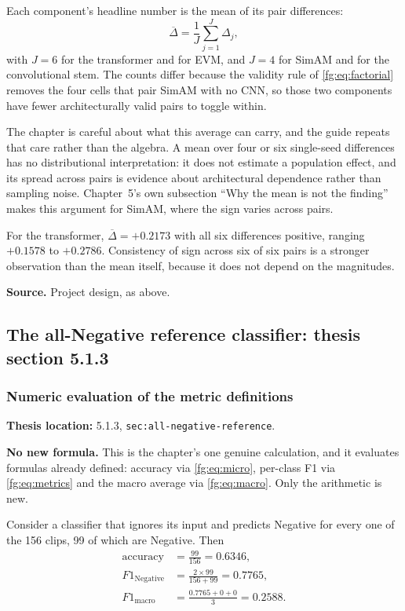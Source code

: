 \documentclass[11pt,a4paper]{article}
\numberwithin{equation}{section}
\begin{document}
Each component's headline number is the mean of its pair differences:
\begin{equation}
    \overline{\Delta} = \frac1J \sum_{j=1}^{J} \Delta_j,
    \label{fg5:eq:mean-effect}
\end{equation}
with $J = 6$ for the transformer and for EVM, and $J = 4$ for SimAM and for
the convolutional stem. The counts differ because the validity rule of
\eqref{fg:eq:factorial} removes the four cells that pair SimAM with no CNN, so those
two components have fewer architecturally valid pairs to toggle within.

The chapter is careful about what this average can carry, and the guide
repeats that care rather than the algebra. A mean over four or six
single-seed differences has no distributional interpretation: it does not
estimate a population effect, and its spread across pairs is evidence about
architectural dependence rather than sampling noise. Chapter~5's own
subsection ``Why the mean is not the finding'' makes this argument for SimAM,
where the sign varies across pairs.

For the transformer, $\overline{\Delta} = +0.2173$ with all six differences
positive, ranging $+0.1578$ to $+0.2786$. Consistency of sign across six of
six pairs is a stronger observation than the mean itself, because it does not
depend on the magnitudes.

\textbf{Source.} Project design, as above.

\subsection{The all-Negative reference classifier: thesis section 5.1.3}

\subsubsection{Numeric evaluation of the metric definitions}
\label{fg5:all-negative}
\textbf{Thesis location:} 5.1.3, \texttt{sec:all-negative-reference}.

\textbf{No new formula.} This is the chapter's one genuine calculation, and it
evaluates formulas already defined: accuracy via
\eqref{fg:eq:micro}, per-class F1 via \eqref{fg:eq:metrics} and the macro average via
\eqref{fg:eq:macro}. Only the arithmetic is new.

Consider a classifier that ignores its input and predicts Negative for every
one of the 156 clips, 99 of which are Negative. Then
\begin{equation}
\begin{aligned}
    \text{accuracy} &= \frac{99}{156} = 0.6346,\\
    F1_{\mathrm{Negative}} &= \frac{2\times 99}{156+99} = 0.7765,\\
    F1_{\mathrm{macro}} &= \frac{0.7765+0+0}{3} = 0.2588.
    \end{aligned}
    \label{fg5:eq:all-negative}
\end{equation}
\end{document}

